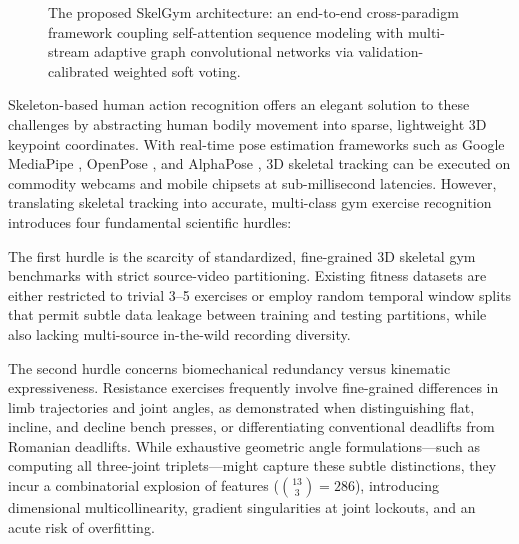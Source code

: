 \documentclass[runningheads]{llncs}
\begin{document}
\begin{figure}[!t]
{
}
\caption{The proposed SkelGym architecture: an end-to-end cross-paradigm framework coupling self-attention sequence modeling with multi-stream adaptive graph convolutional networks via validation-calibrated weighted soft voting.}
\label{fig:pipeline_full}
\end{figure}

Skeleton-based human action recognition offers an elegant solution to these challenges by abstracting human bodily movement into sparse, lightweight 3D keypoint coordinates. With real-time pose estimation frameworks such as Google MediaPipe \cite{chuankun2019,bazarevsky2020}, OpenPose \cite{cao2019}, and AlphaPose \cite{fang2022}, 3D skeletal tracking can be executed on commodity webcams and mobile chipsets at sub-millisecond latencies. However, translating skeletal tracking into accurate, multi-class gym exercise recognition introduces four fundamental scientific hurdles:

The first hurdle is the scarcity of standardized, fine-grained 3D skeletal gym benchmarks with strict source-video partitioning. Existing fitness datasets are either restricted to trivial 3--5 exercises or employ random temporal window splits that permit subtle data leakage between training and testing partitions, while also lacking multi-source in-the-wild recording diversity.

The second hurdle concerns biomechanical redundancy versus kinematic expressiveness. Resistance exercises frequently involve fine-grained differences in limb trajectories and joint angles, as demonstrated when distinguishing flat, incline, and decline bench presses, or differentiating conventional deadlifts from Romanian deadlifts. While exhaustive geometric angle formulations---such as computing all three-joint triplets---might capture these subtle distinctions, they incur a combinatorial explosion of features ($\binom{13}{3} = 286$), introducing dimensional multicollinearity, gradient singularities at joint lockouts, and an acute risk of overfitting.
\end{document}
